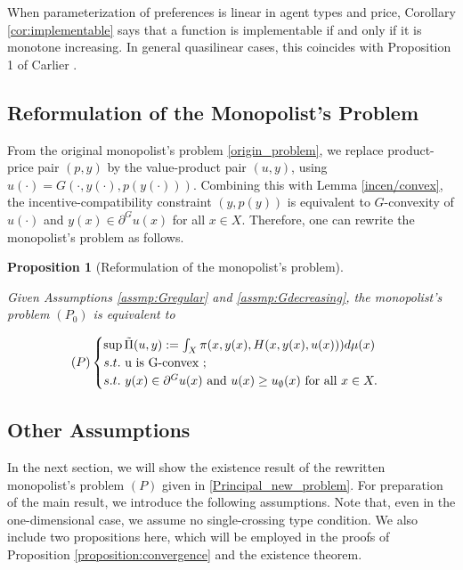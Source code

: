 \documentclass[a4paper, 11pt]{amsart}
\numberwithin{equation}{section}
\theoremstyle{plain}
\newtheorem{proposition}[theorem]{Proposition}
\theoremstyle{definition}
\theoremstyle{remark}
\begin{document}
When parameterization of preferences is linear in agent types and price, Corollary \ref{cor:implementable} says that a function is implementable if and only if it is monotone increasing. In general quasilinear cases, this coincides with Proposition 1 of Carlier \cite{Carlier01}. \medskip


\subsection{Reformulation of the Monopolist's Problem}\label{subsection:reformulation}
From the original monopolist's problem \eqref{origin_problem}, we replace product-price pair $(p,y)$ by the value-product pair $(u,y)$, using $u(\cdot) = G(\cdot, y(\cdot), p(y(\cdot)))$. %
Combining this with Lemma \ref{incen/convex}, the incentive-compatibility constraint $(y,p(y))$ is equivalent to $G$-convexity of $u(\cdot)$ and $y(x) \in \partial^G u(x)$ for all $x\in X$. Therefore, one can rewrite the monopolist's problem as follows.

\begin{proposition}[Reformulation of the monopolist’s problem]\label{equiv_form}
	
	Given Assumptions \ref{assmp:Gregular} and \ref{assmp:Gdecreasing}, the monopolist's problem $(P_0)$ is equivalent to
	
	\begin{equation}\label{Principal_new_problem}
	(P)
	\begin{cases}
	\sup \tilde{\Pi}(u,y):=\int_{X} \pi(x, y(x), H(x,y(x), u(x))) d\mu(x)\\
	s.t.\ $u$ \text{ is } $G$\text{-convex };\\
	s.t.\ y(x) \in \partial^G u(x) \text{ and }u(x)\ge u_{\emptyset}(x) \text{ for all } x \in X.
	\end{cases}
	\end{equation}
\end{proposition}

\medskip


\subsection{Other Assumptions}\label{subsection:assumptions}
In the next section, we will show the existence result of the rewritten monopolist's problem $(P)$ given in \eqref{Principal_new_problem}. For preparation of the main result, we introduce the following assumptions. Note that, even in the one-dimensional case, we assume no single-crossing type condition. We also include two propositions here, which will be employed in the proofs of Proposition \ref{proposition:convergence} and the existence theorem. \medskip%
\end{document}
